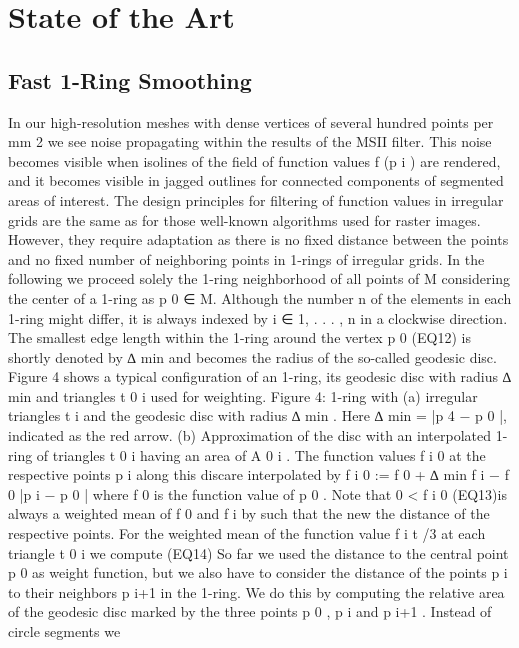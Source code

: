 \documentclass[openany]{book}
\begin{document}
\chapter{State of the Art}



\section{Fast 1-Ring Smoothing}
In our high-resolution meshes with dense vertices of several hundred points per 
mm 2 we see noise propagating within the results of the MSII filter. This noise 
becomes visible when isolines of the field of function values f (p i ) are 
rendered, and it becomes visible in jagged outlines for connected components of 
segmented areas of interest. The design principles for filtering of function 
values in irregular grids are the same as for those well-known algorithms used 
for raster images. However, they require adaptation as there is no fixed 
distance between the points and no fixed number of neighboring points in 
1-rings of irregular grids. In the following we proceed solely the 1-ring 
neighborhood of all points of M considering the center of a 1-ring as p 0 ∈ M. 
Although the number n of the elements in each 1-ring might differ, it is always 
indexed by i ∈ {1, . . . , n} in a clockwise direction. The smallest edge 
length within the 1-ring around the vertex p 0 
(EQ12) is shortly denoted by ∆ min and becomes the radius of the so-called 
geodesic disc. Figure 4 shows a typical configuration of an 1-ring, its geodesic 
disc with radius ∆ min and triangles t 0 i used for weighting.
Figure 4: 1-ring with (a) irregular triangles t i and the geodesic disc with 
radius ∆ min . Here ∆ min = |p 4 − p 0 |, indicated as the red arrow. (b) 
Approximation of the disc with an interpolated 1-ring of triangles t 0 i having 
an area of A 0 i . The function values f i 0 at the respective points p i along 
this discare interpolated by f i 0 := f 0 + ∆ min f i − f 0 |p i − p 0 | where 
f 0 is the function value of p 0 . Note that 0 < f i 0
(EQ13)is always a weighted mean of f 0 and f i by such that the new the distance 
of the respective points. For the weighted mean of the function value f i t /3 
at each triangle t 0 i we compute (EQ14)
So far we used the distance to the central point p 0 as weight function, but we 
also have to consider the distance of the points p i to their neighbors p i+1 
in the 1-ring. We do this by computing the relative area of the geodesic disc 
marked by the three points p 0 , p i and p i+1 . Instead of circle segments we 
\end{document}
